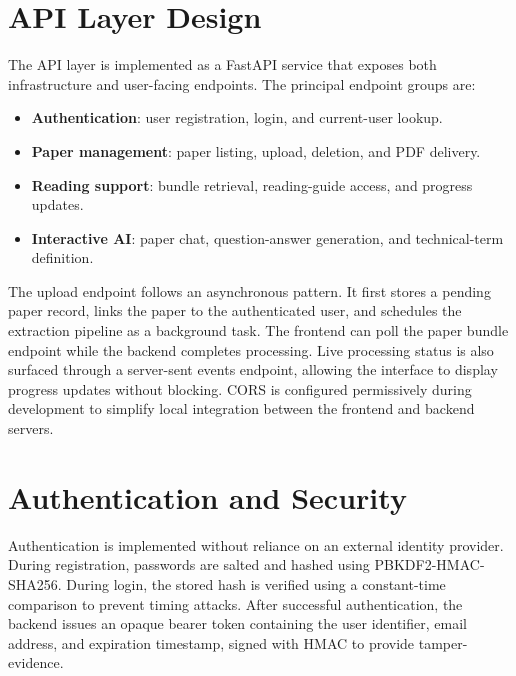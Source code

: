 \documentclass[12pt,a4paper]{report}
\begin{document}
\section{API Layer Design}

The API layer is implemented as a FastAPI service that exposes both
infrastructure and user-facing endpoints. The principal endpoint groups are:

\begin{itemize}
    \item \textbf{Authentication}: user registration, login, and current-user
    lookup.
    \item \textbf{Paper management}: paper listing, upload, deletion, and PDF
    delivery.
    \item \textbf{Reading support}: bundle retrieval, reading-guide access, and
    progress updates.
    \item \textbf{Interactive AI}: paper chat, question-answer generation, and
    technical-term definition.
\end{itemize}

The upload endpoint follows an asynchronous pattern. It first stores a pending
paper record, links the paper to the authenticated user, and schedules the
extraction pipeline as a background task. The frontend can poll the paper bundle
endpoint while the backend completes processing. Live processing status is also
surfaced through a server-sent events endpoint, allowing the interface to display
progress updates without blocking. CORS is configured permissively during
development to simplify local integration between the frontend and backend
servers.

\section{Authentication and Security}

Authentication is implemented without reliance on an external identity provider.
During registration, passwords are salted and hashed using PBKDF2-HMAC-SHA256.
During login, the stored hash is verified using a constant-time comparison to
prevent timing attacks. After successful authentication, the backend issues an
opaque bearer token containing the user identifier, email address, and
expiration timestamp, signed with HMAC to provide tamper-evidence.
\end{document}
